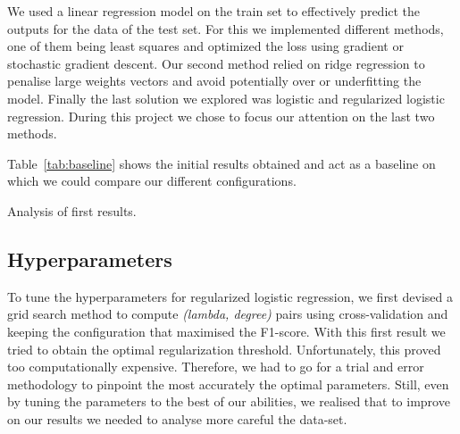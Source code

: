 \documentclass[10pt,conference,compsocconf]{IEEEtran}
\begin{document}
We used a linear regression model on the train set to effectively 
predict the outputs for the data of the test set. For this we implemented 
different methods, one of them being least squares and optimized the 
loss using gradient or stochastic gradient descent.
Our second method relied on ridge regression to penalise large weights 
vectors and avoid potentially over or underfitting the model.
Finally the last solution we explored was logistic and regularized 
logistic regression. During this project we chose to focus our attention on
the last two methods.

\begin{table}[ht]
\centering
{}
\caption{Parameters and training results for the initial implementation.}
\label{tab:baseline}
\end{table}

Table~\ref{tab:baseline} shows the initial results obtained and act as a baseline 
on which we could compare our different configurations.

Analysis of first results.

\subsection{Hyperparameters}
To tune the hyperparameters for regularized logistic regression, 
we first devised a grid search method to compute \textit{(lambda, degree)} 
pairs using cross-validation and keeping the configuration 
that maximised the F1-score. With this first result we tried to obtain 
the optimal regularization threshold.
Unfortunately, this proved too computationally expensive. Therefore, 
we had to go for a trial and error methodology to pinpoint the most 
accurately the optimal parameters.
Still, even by tuning the parameters to the best of our abilities, 
we realised that to improve on our results we needed to analyse more 
careful the data-set.
\end{document}
